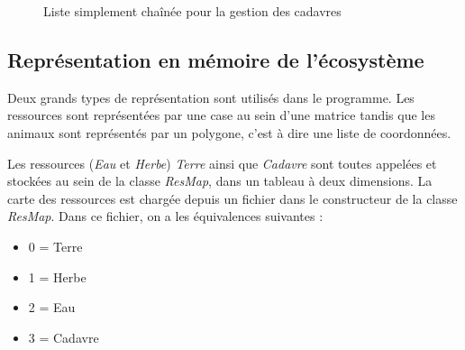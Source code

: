 \documentclass[a4paper,11pt,final,oneside]{article}
\begin{document}
\begin{figure}[h!]
\centering		
{}
\caption{Liste simplement chaînée pour la gestion des cadavres}
\label{fig:rep}
\end{figure}

		\subsection{Représentation en mémoire de l'écosystème}
Deux grands types de représentation sont utilisés dans le programme. Les ressources sont représentées par une case au sein d'une matrice tandis que les animaux sont représentés par un polygone, c'est à dire une liste de coordonnées.

Les ressources (\textit{Eau} et \textit{Herbe}) \textit{Terre} ainsi que \textit{Cadavre} sont toutes appelées et stockées au sein de la classe \textit{ResMap}, dans un tableau à deux dimensions. La carte des ressources est chargée depuis un fichier dans le constructeur de la classe \textit{ResMap}. Dans ce fichier, on a les équivalences suivantes :
\medskip
\begin{itemize}
	\item 0 = Terre
	\item 1 = Herbe
	\item 2 = Eau
	\item 3 = Cadavre
\end{itemize}
\medskip
\end{document}
